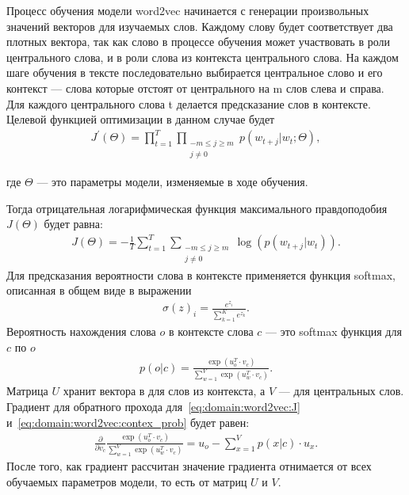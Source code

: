 Процесс обучения модели word2vec начинается с генерации произвольных значений векторов для изучаемых слов. Каждому слову будет соответствует два плотных вектора, так как слово в процессе обучения может участвовать в роли центрального слова, и в роли слова из контекста центрального слова. На каждом шаге обучения в тексте последовательно выбирается центральное слово и его контекст --- слова которые отстоят от центрального на m слов слева и справа. Для каждого центрального слова t делается предсказание слов в контексте\cite{word2vec}. Целевой функцией оптимизации в данном случае будет
\begin{gather}
  J^{\prime}(\Theta) = \prod_{t=1}^{T}\prod_{\substack{-m\leq j \geq m\\j \neq 0}}p(w_{t+j}|w_{t};\Theta),
\end{gather}
\begin{explanationx}
\item [где] $ \Theta $ --- это параметры модели, изменяемые в ходе обучения.
\end{explanationx}

Тогда отрицательная логарифмическая функция максимального правдоподобия $ J(\Theta) $ будет равна:
\begin{gather}
  \label{eq:domain:word2vec:J}
  J(\Theta) = -\frac{1}{T}\sum_{t=1}^{T}\sum_{\substack{-m\leq j \geq m\\j \neq 0}}\log(p(w_{t+j}|w_{t})).
\end{gather}
Для предсказания вероятности слова в контексте применяется функция softmax, описанная в общем виде в выражении
\begin{gather}
  \label{eq:domain:softmax}
  {\sigma(z)}_i = \frac{e^{z_i}}{\sum_{k=1}^{K}e^{z_k}}.
\end{gather}
Вероятность нахождения слова $o$ в контексте слова $c$ --- это softmax функция для $c$ по $o$
\begin{gather}\label{eq:domain:word2vec:contex_prob}
  p(o|c) = \frac{\exp({u_{o}^T}\cdot{v_{c}})}{\sum_{w=1}^{V}\exp({u_w^T}\cdot{v_{c}})}.
\end{gather}
Матрица $U$ хранит вектора в для слов из контекста, а $V$ --- для центральных слов.
Градиент для обратного прохода для~\ref{eq:domain:word2vec:J} и~\ref{eq:domain:word2vec:contex_prob} будет равен:
\begin{gather}
  \frac{\partial }{\partial v_c}\frac{\exp({u_{o}^T}\cdot{v_{c}})}{\sum_{w=1}^{V}\exp({u_w^T}\cdot{v_{c}})} = u_o - \sum_{x=1}^{V}p(x|c)\cdot{u_x}.
\end{gather}
После того, как градиент рассчитан значение градиента отнимается от всех обучаемых параметров модели, то есть от матриц $U$ и $V$.

